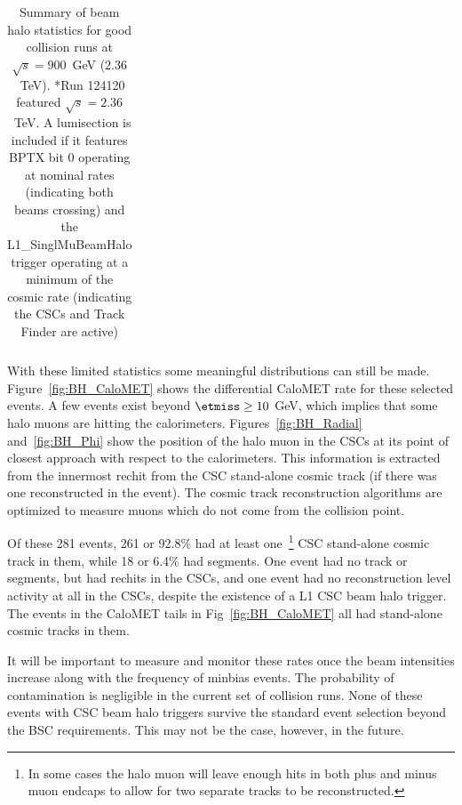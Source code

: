 \begin{table}[h]
\begin{center}
\begin{tabular}{|c|c|c|c|c|c|c|}
\end{tabular}
\end{center}
\caption{Summary of beam halo statistics for good collision runs at $\sqrt{s}=900$~GeV ($2.36$~TeV). *Run 124120 featured $\sqrt{s}=2.36$~TeV. A lumisection is included if it features BPTX bit 0 operating at nominal rates (indicating both beams crossing) and the L1\_SinglMuBeamHalo trigger operating at a minimum of the cosmic rate (indicating the CSCs and Track Finder are active)}
\label{tab:BHStats}
\end{table}

With these limited statistics some meaningful distributions can still be made. Figure~\ref{fig:BH_CaloMET} shows the differential  CaloMET rate for these selected events.  A few events exist beyond $\etmiss \ge 10$ GeV, which implies that some halo muons are hitting the calorimeters. Figures~\ref{fig:BH_Radial} and~\ref{fig:BH_Phi} show the position of the halo muon in the CSCs at its point of closest approach with respect to the calorimeters.  This information is extracted from the innermost rechit from the  CSC stand-alone cosmic track (if there was one reconstructed in the event).  The cosmic track reconstruction algorithms are optimized to measure muons which do not come from the collision point.

Of these 281 events, 261 or 92.8\% had at least one~\footnote{In some cases the halo muon will leave enough hits in both plus and minus muon endcaps to allow for two separate tracks to be reconstructed.} CSC stand-alone cosmic track in them, while 18 or 6.4\% had segments.  One event had no track or segments, but had rechits in the CSCs, and one event had no reconstruction level activity at all in the CSCs, despite the existence of a L1 CSC beam halo trigger.  The events in the CaloMET tails in Fig~\ref{fig:BH_CaloMET} all had stand-alone cosmic tracks in them.  

It will be important to measure and monitor these rates once the beam intensities increase along with the frequency of minbias events. The probability of contamination is negligible in the current set of collision runs.  None of these events with CSC beam halo triggers survive the standard event selection beyond the BSC requirements. This may not be the case, however, in the future.  \\


